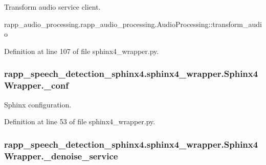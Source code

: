 Transform audio service client. 

rapp\-\_\-audio\-\_\-processing.\-rapp\-\_\-audio\-\_\-processing.\-Audio\-Processing\-::transform\-\_\-audio 

Definition at line 107 of file sphinx4\-\_\-wrapper.\-py.

\hypertarget{classrapp__speech__detection__sphinx4_1_1sphinx4__wrapper_1_1Sphinx4Wrapper_a8b61ba8ea3e28ea8cb2317d1a83a2730}{
\subsubsection[{\-\_\-conf}]{\setlength{\rightskip}{0pt plus 5cm}rapp\-\_\-speech\-\_\-detection\-\_\-sphinx4.\-sphinx4\-\_\-wrapper.\-Sphinx4\-Wrapper.\-\_\-conf\hspace{0.3cm}{\ttfamily [private]}}}\label{classrapp__speech__detection__sphinx4_1_1sphinx4__wrapper_1_1Sphinx4Wrapper_a8b61ba8ea3e28ea8cb2317d1a83a2730}


Sphinx configuration. 



Definition at line 53 of file sphinx4\-\_\-wrapper.\-py.

\hypertarget{classrapp__speech__detection__sphinx4_1_1sphinx4__wrapper_1_1Sphinx4Wrapper_ad2e35b438312ce2396718371a9461597}{
\subsubsection[{\-\_\-denoise\-\_\-service}]{\setlength{\rightskip}{0pt plus 5cm}rapp\-\_\-speech\-\_\-detection\-\_\-sphinx4.\-sphinx4\-\_\-wrapper.\-Sphinx4\-Wrapper.\-\_\-denoise\-\_\-service\hspace{0.3cm}{\ttfamily [private]}}}\label{classrapp__speech__detection__sphinx4_1_1sphinx4__wrapper_1_1Sphinx4Wrapper_ad2e35b438312ce2396718371a9461597}


